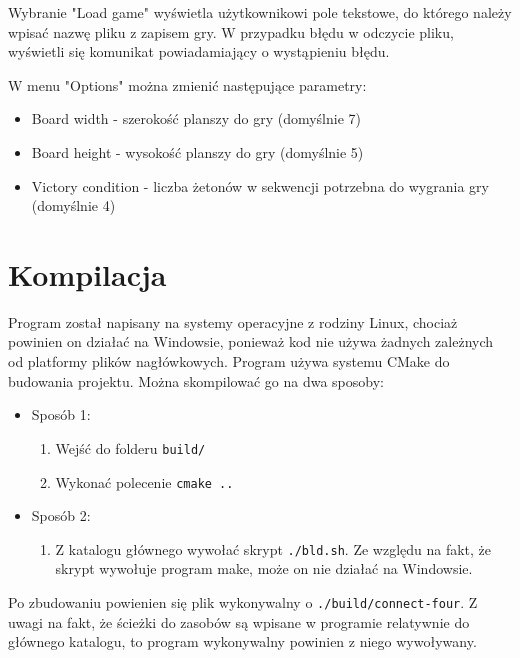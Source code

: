 \documentclass{article}
\begin{document}
Wybranie "Load game" wyświetla użytkownikowi pole tekstowe, do którego należy wpisać nazwę pliku z zapisem gry. W przypadku błędu w odczycie pliku, wyświetli się komunikat powiadamiający o wystąpieniu błędu.

W menu "Options" można zmienić następujące parametry:
\begin{itemize}
    \item Board width - szerokość planszy do gry (domyślnie 7)
    \item Board height - wysokość planszy do gry (domyślnie 5)
    \item Victory condition - liczba żetonów w sekwencji potrzebna do wygrania gry (domyślnie 4)
\end{itemize}

\section{Kompilacja}

Program został napisany na systemy operacyjne z rodziny Linux, 
chociaż powinien on działać na Windowsie, ponieważ kod nie 
używa żadnych zależnych od platformy plików nagłówkowych. 
Program używa  systemu CMake do budowania projektu. 
Można skompilować go na dwa sposoby:
    \begin{itemize}
         
    \item Sposób 1:
        \begin{enumerate}
            \item Wejść do folderu \texttt{build/}
            \item Wykonać polecenie \texttt{cmake ..}
        \end{enumerate}

    \item Sposób 2:
        \begin{enumerate}
            \item Z katalogu głównego wywołać skrypt \texttt{./bld.sh}. Ze względu na fakt, że skrypt wywołuje program make, może on nie działać na Windowsie.
        \end{enumerate}

    \end{itemize}

Po zbudowaniu powienien się plik wykonywalny o \texttt{./build/connect-four}.
Z uwagi na fakt, że ścieżki do zasobów są wpisane w programie relatywnie 
do głównego katalogu, to program wykonywalny powinien z niego wywoływany.
\end{document}
